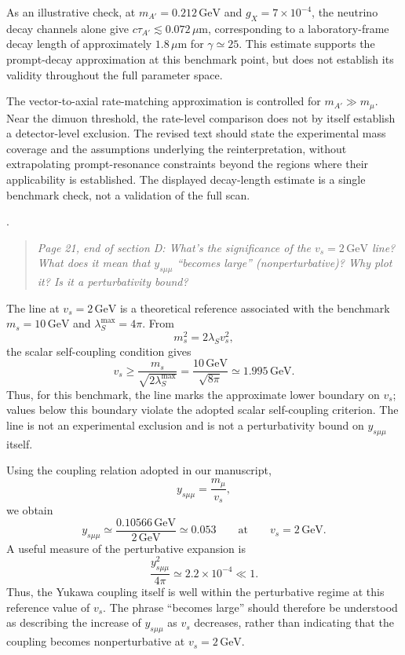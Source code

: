 \documentclass[12pt,a4paper]{article}
\begin{document}
As an illustrative check, at \(m_{A'}=0.212\,\mathrm{GeV}\) and \(g_X=7\times10^{-4}\), the neutrino decay channels alone give \(c\tau_{A'}\lesssim0.072\,\mu\mathrm{m}\), corresponding to a laboratory-frame decay length of approximately \(1.8\,\mu\mathrm{m}\) for \(\gamma\simeq25\). This estimate supports the prompt-decay approximation at this benchmark point, but does not establish its validity throughout the full parameter space.

The vector-to-axial rate-matching approximation is controlled for \(m_{A'}\gg m_\mu\). Near the dimuon threshold, the rate-level comparison does not by itself establish a detector-level exclusion. The revised text should state the experimental mass coverage and the assumptions underlying the reinterpretation, without extrapolating prompt-resonance constraints beyond the regions where their applicability is established. The displayed decay-length estimate is a single benchmark check, not a validation of the full scan.

\medskip
{}. \begin{quote}\itshape
Page 21, end of section D: What's the significance of the \(v_s=2\,\mathrm{GeV}\) line? What does it mean that \(y_{s\mu\mu}\) ``becomes large'' (nonperturbative)? Why plot it? Is it a perturbativity bound?
\end{quote}

The line at \(v_s=2\,\mathrm{GeV}\) is a theoretical reference associated with the benchmark \(m_s=10\,\mathrm{GeV}\) and \(\lambda_S^{\max}=4\pi\). From
\[
m_s^2=2\lambda_Sv_s^2,
\]
the scalar self-coupling condition gives
\[
v_s\geq\frac{m_s}{\sqrt{2\lambda_S^{\max}}}
=\frac{10\,\mathrm{GeV}}{\sqrt{8\pi}}
\simeq1.995\,\mathrm{GeV}.
\]
Thus, for this benchmark, the line marks the approximate lower boundary on \(v_s\); values below this boundary violate the adopted scalar self-coupling criterion. The line is not an experimental exclusion and is not a perturbativity bound on \(y_{s\mu\mu}\) itself.

Using the coupling relation adopted in our manuscript,
\[
y_{s\mu\mu}=\frac{m_\mu}{v_s},
\]
we obtain
\[
y_{s\mu\mu}\simeq
\frac{0.10566\,\mathrm{GeV}}{2\,\mathrm{GeV}}
\simeq0.053
\qquad\text{at}\qquad v_s=2\,\mathrm{GeV}.
\]
A useful measure of the perturbative expansion is
\[
\frac{y_{s\mu\mu}^2}{4\pi}
\simeq2.2\times10^{-4}\ll1.
\]
Thus, the Yukawa coupling itself is well within the perturbative regime at this reference value of \(v_s\). The phrase ``becomes large'' should therefore be understood as describing the increase of \(y_{s\mu\mu}\) as \(v_s\) decreases, rather than indicating that the coupling becomes nonperturbative at \(v_s=2\,\mathrm{GeV}\).
\end{document}
